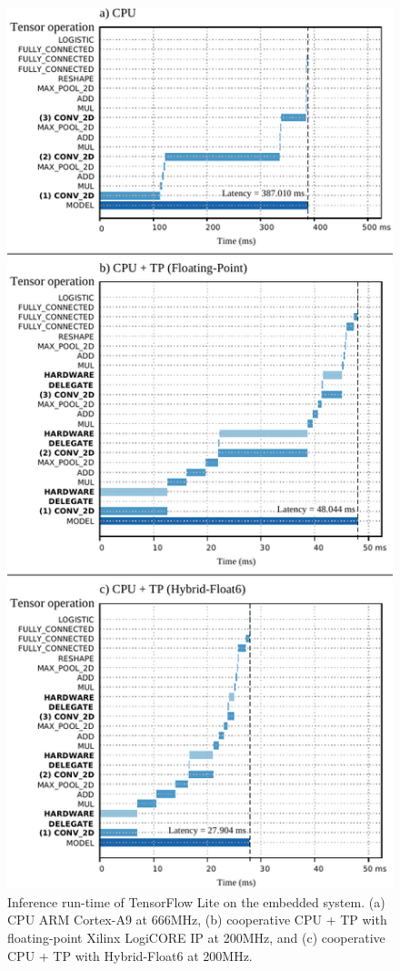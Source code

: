 \begin{figure}[t!]
	\centering
	\includegraphics[width=1\columnwidth]{../figures/runtime/runtime.pdf}
	\caption{Inference run-time of TensorFlow Lite on the embedded system. (a) CPU ARM Cortex-A9 at 666MHz, (b) cooperative CPU + TP with floating-point Xilinx LogiCORE IP at 200MHz, and (c) cooperative CPU + TP with Hybrid-Float6 at 200MHz.}
	\label{fig:runtime}
\end{figure}

